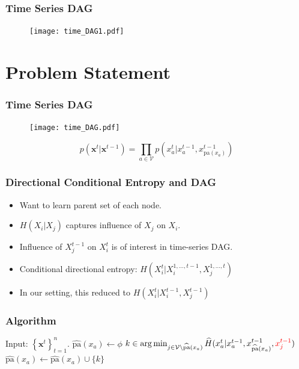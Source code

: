 \documentclass{beamer}
\begin{document}
\begin{frame}
\frametitle{Time Series DAG}
\begin{figure}
	\centering
		\texttt{[image: time\_DAG1.pdf]}
	\label{fig:2}
\end{figure}
\end{frame}

\section{Problem Statement}
\begin{frame}
\frametitle{Time Series DAG}
\begin{figure}
	\centering
		\texttt{[image: time\_DAG.pdf]}
	\label{fig:2}
\end{figure}
$$p\left(\mathbf{x}^t|\mathbf{x}^{t-1}\right) = \prod_{a \in \mathcal{V}}{p\left(x_a^{t}|x_a^{t-1}, x^{t-1}_{\text{pa}(x_a)}\right)}$$
\end{frame}

\begin{frame}
\frametitle{Directional Conditional Entropy and DAG}
\begin{itemize}
\item Want to learn parent set of each node.
\item $H(X_i|X_j)$ captures influence of $X_j$ on $X_i$.
\item Influence of  $X^{t-1}_j$ on $X^{t}_i$ is of interest in time-series DAG.
\item Conditional directional entropy: $H\left(X^t_i|X^{1,\ldots, t-1}_i, X^{1,\ldots, t}_j\right)$
\item In our setting, this reduced to $H\left(X^t_i|X^{t-1}_i, X^{t-1}_j\right)$
\end{itemize}
\end{frame}



\begin{frame}
\frametitle{Algorithm}
\footnotesize
\hline
\begin{algorithmic}[1]
\STATE Input: $\left\{\mathbf{x}^t\right\}_{t=1}^{n}$.
\STATE $\widehat{\text{pa}}(x_a) \leftarrow \phi$%
\STATE $k \in \arg \min_{j \in \mathcal{V}\backslash \widehat{\text{pa}}(x_a)}\widehat{H}(x^t_a|x^{t-1}_a, x^{t-1}_{\widehat{\text{pa}}(x_a)}, {\color{red}{x^{t-1}_j}})$
\STATE $\widehat{\text{pa}}(x_a) \leftarrow \widehat{\text{pa}}(x_a) \cup \{k\}$
\ENDIF
\ENDWHILE
\ENDFOR
\end{algorithmic}
\vspace{0.1in}
\hline
\end{frame}
\end{document}
